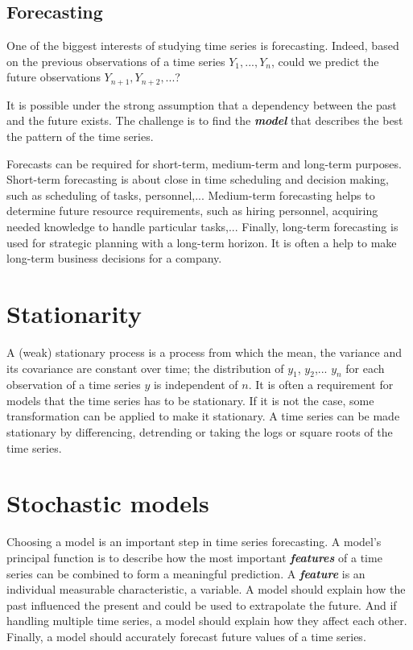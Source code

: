 \documentclass[11pt,a4paper,oneside]{book}
\begin{document}
\subsection{Forecasting}

One of the biggest interests of studying time series is forecasting. Indeed, based on the previous observations of a time series $Y_{1},...,Y_{n}$, could we predict the future observations  $Y_{n+1}, Y_{n+2},...$? 

It is possible under the strong assumption that a dependency between the past and the future exists. The challenge is to find the \textit{\textbf{model}} that describes the best the pattern of the time series.

Forecasts can be required for short-term, medium-term and long-term purposes. Short-term forecasting is about close in time scheduling and decision making, such as scheduling of tasks, personnel,... Medium-term forecasting helps to determine future resource requirements, such as hiring personnel, acquiring needed knowledge to handle particular tasks,... Finally, long-term forecasting is used for strategic planning with a long-term horizon. It is often a help to make long-term business decisions for a company. \cite{hyndman}


\section{Stationarity}

A (weak) stationary process is a process from which the mean, the variance and its covariance are constant over time; the distribution of $y_1$, $y_2$,... $y_n$ for each observation of a time series $y$ is independent of $n$. It is often a requirement for models that the time series has to be stationary. If it is not the case, some transformation can be applied to make it stationary. A time series can be made stationary by differencing, detrending or taking the logs or square roots of the time series. \cite{hyndman}



\section{Stochastic models}

Choosing a model is an important step in time series forecasting. A model's principal function is to describe how the most important \textit{\textbf{features}} of a time series can be combined to form a meaningful prediction. A \textit{\textbf{feature}} is an individual measurable characteristic, a variable. A model should explain how the past influenced the present and could be used to extrapolate the future. And if handling multiple time series, a model should explain how they affect each other. Finally, a model should accurately forecast future values of a time series. \cite{hyndman}
\end{document}
